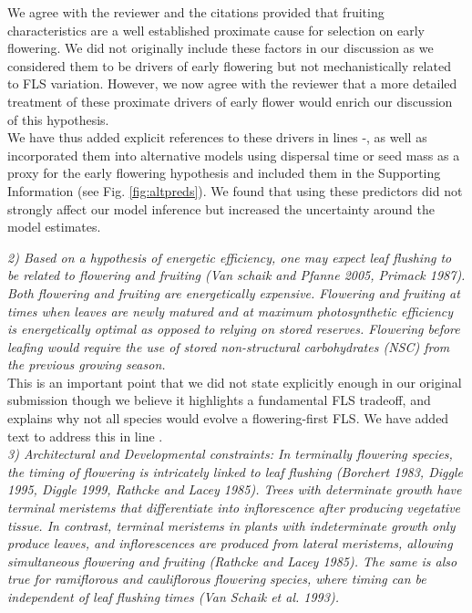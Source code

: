 \documentclass{article}[11pt]
\begin{document}
\noindent We agree with the reviewer and the citations provided that fruiting characteristics are a well established proximate cause for selection on early flowering. We did not originally include these factors in our discussion as we considered them to be drivers of early flowering but not mechanistically related to FLS variation. However, we now agree with the reviewer that a more detailed treatment of these proximate drivers of early flower would enrich our discussion of this hypothesis. \\

We have thus added explicit references to these drivers in lines -, as well as incorporated them into alternative models using dispersal time or seed mass as a proxy for the early flowering hypothesis and included them in the Supporting Information (see Fig. \ref{fig:altpreds}). We found that using these predictors did not strongly affect our model inference but increased the uncertainty around the model estimates.

\emph{2) Based on a hypothesis of energetic efficiency, one may expect leaf flushing to be related to flowering and fruiting (Van schaik and Pfanne 2005, Primack 1987). Both flowering and fruiting are energetically expensive. Flowering and fruiting at times when leaves are newly matured and at maximum photosynthetic efficiency is energetically optimal as opposed to relying on stored reserves. Flowering before leafing would require the use of stored non-structural carbohydrates (NSC) from the previous growing season.}\\

\noindent This is an important point that we did not state explicitly enough in our original submission though we believe it highlights a fundamental FLS tradeoff, and explains why not all species would evolve a flowering-first FLS. We have added text to address this in line .\\

\emph{3) Architectural and Developmental constraints: In terminally flowering species, the timing of flowering is intricately linked to leaf flushing (Borchert 1983, Diggle 1995, Diggle 1999, Rathcke and Lacey 1985). Trees with determinate growth have terminal meristems that differentiate into inflorescence after producing vegetative tissue. In contrast, terminal meristems in plants with indeterminate growth only produce leaves, and inflorescences are produced from lateral meristems, allowing simultaneous flowering and fruiting (Rathcke and Lacey 1985). The same is also true for ramiflorous and cauliflorous flowering species, where timing can be independent of leaf flushing times (Van Schaik et al. 1993).}
\end{document}
